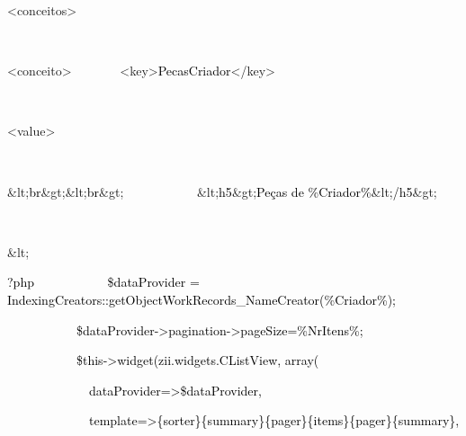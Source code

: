 \documentclass[letterpaper]{article}
\begin{document}
{
\textcolor[rgb]{0.0,0.0,0.5882353}{{\textless}conceitos{\textgreater}}\textcolor{black}{\newline

\ \ \ }\textcolor[rgb]{0.0,0.0,0.5882353}{{\textless}conceito{\textgreater}}\newline
\textcolor{black}{
\ \ \ \ \ \ \ }\textcolor[rgb]{0.0,0.0,0.5882353}{{\textless}key{\textgreater}}\textcolor{black}{PecasCriador}\textcolor[rgb]{0.0,0.0,0.5882353}{{\textless}/key{\textgreater}}\textcolor{black}{\newline

\ \ \ \ \ \ \ }\textcolor[rgb]{0.0,0.0,0.5882353}{{\textless}value{\textgreater}}\textcolor{black}{\newline

\ \ \ \ \ \ \ \ \ \ \ }\textcolor[rgb]{0.5882353,0.5882353,0.0}{\&lt;}\textcolor{black}{br}\textcolor[rgb]{0.5882353,0.5882353,0.0}{\&gt;\&lt;}\textcolor{black}{br}\textcolor[rgb]{0.5882353,0.5882353,0.0}{\&gt;}\newline
\textcolor{black}{
\ \ \ \ \ \ \ \ \ \ \ }\textcolor[rgb]{0.5882353,0.5882353,0.0}{\&lt;}\textcolor{black}{h5}\textcolor[rgb]{0.5882353,0.5882353,0.0}{\&gt;}\textcolor{black}{Pe\c{c}as
de
\%Criador\%}\textcolor[rgb]{0.5882353,0.5882353,0.0}{\&lt;}\textcolor{black}{/h5}\textcolor[rgb]{0.5882353,0.5882353,0.0}{\&gt;}\textcolor{black}{\newline

\ \ \ \ \ \ \ \ \ \ \ }\textcolor[rgb]{0.5882353,0.5882353,0.0}{\&lt;}\textcolor{black}{?php
\newline
 \ \ \ \ \ \ \ \ \ \ \ \$dataProvider =
IndexingCreators::getObjectWorkRecords\_NameCreator({\textquotesingle}\%Criador\%{\textquotesingle});\newline

\ \ \ \ \ \ \ \ \ \ \ \$dataProvider-{\textgreater}pagination-{\textgreater}pageSize=\%NrItens\%;\newline
 \ \ \ \ \ \ \ \ \ \ \ \newline

\ \ \ \ \ \ \ \ \ \ \ \$this-{\textgreater}widget({\textquotesingle}zii.widgets.CListView{\textquotesingle},
array(\newline

\ \ \ \ \ \ \ \ \ \ \ \ \ {\textquotesingle}dataProvider{\textquotesingle}={\textgreater}\$dataProvider,\newline

\ \ \ \ \ \ \ \ \ \ \ \ \ {\textquotesingle}template{\textquotesingle}={\textgreater}{\textquotesingle}\{sorter\}\{summary\}\{pager\}\{items\}\{pager\}\{summary\}{\textquotesingle},\newline

}}
\end{document}
